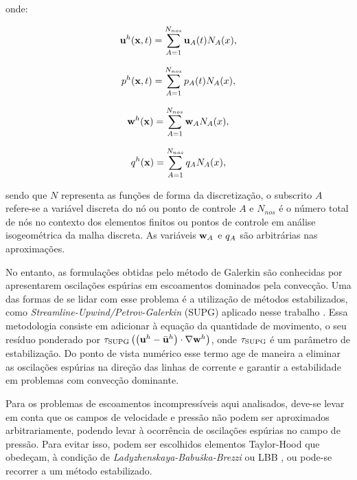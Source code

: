 \documentclass[tese_patricia]{subfiles}%
\begin{document}
\noindent onde:

\begin{align}
\mathbf{u}^{h}(\mathbf{x},t) = \sum_{A = 1}^{N_{nos}} \mathbf{u}_{A}(t)N_{A}(x), \label{eq:dis_vel}
\end{align}

\begin{align}
p^{h}(\mathbf{x},t)  = \sum_{A = 1}^{N_{nos}} p_{A}(t)N_{A}(x),
\end{align}

\begin{align}
\mathbf{w}^{h}(\mathbf{x})  = \sum_{A = 1}^{N_{nos}} \mathbf{w}_{A}N_{A}(x), \label{eq:utest}
\end{align}

\begin{align}
q^{h}(\mathbf{x})  = \sum_{A = 1}^{N_{nos}} q_{A}N_{A}(x), \label{eq:ptest} 
\end{align}

\noindent sendo que $N$ representa as funções de forma da discretização, o subscrito $A$ refere-se a variável discreta do nó ou ponto de controle $A$ e $N_{nos}$ é o número total de nós no contexto dos elementos finitos ou pontos de controle em análise isogeométrica da malha discreta. As variáveis $\mathbf{w}_{A}$ e $q_{A}$ são arbitrárias nas aproximações.

No entanto, as formulações obtidas pelo método de Galerkin são conhecidas por apresentarem oscilações espúrias em escoamentos dominados pela convecção. Uma das formas de se lidar com esse problema é a utilização de métodos estabilizados, como \textit{Streamline-Upwind/Petrov-Galerkin} (SUPG) aplicado nesse trabalho \cite{BrooksH:1982, HughesT:1984}. Essa metodologia consiste em adicionar à equação da quantidade de movimento, o seu resíduo ponderado por $\tau_{\mathrm{SUPG}} \left(\left(\mathbf{u}^h- \bar{\mathbf{u}}^h\right) \cdot \nabla\mathbf{w}^h\right)$, onde $\tau_{\mathrm{SUPG}}$ é um parâmetro de estabilização. Do ponto de vista numérico esse termo age de maneira a eliminar as oscilações espúrias na direção das linhas de corrente e garantir a estabilidade em problemas com convecção dominante. 

Para os problemas de escoamentos incompressíveis aqui analisados, deve-se levar em conta que os campos de velocidade e pressão não podem ser aproximados arbitrariamente, podendo levar à ocorrência de oscilações espúrias no campo de pressão. Para evitar isso, podem ser escolhidos elementos Taylor-Hood que obedeçam, à condição de \textit{Ladyzhenskaya-Babuška-Brezzi} ou LBB \cite{BrezziF:1991,ZienkiewiczTN:2005,StrangF:2008}, ou pode-se recorrer a um método estabilizado. 
\end{document}
